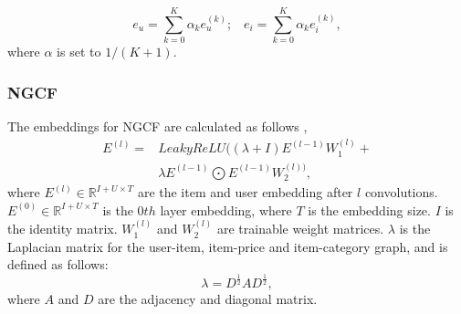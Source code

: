 \begin{equation}
    e_u = \sum_{k=0}^{K} \alpha_k e_u^{(k)};\;\;\; e_i = \sum_{k=0}^{K} \alpha_k e_i^{(k)},
\end{equation}
where $\alpha$ is set to $1/(K + 1)$.

\subsubsection{NGCF}\label{subsubsec:NGCF-embed}
The embeddings for NGCF are calculated as follows \cite{NGCF_2019},
\begin{equation}
    \begin{split}
        E^{(l)} = &LeakyReLU((\lambda + I)E^{(l-1)}W_1^{(l)}+\\
        & \lambda E^{(l-1)}\bigodot E^{(l-1)}W_2^{(l))},
    \end{split}
\end{equation}
where $E^{(l)} \in \mathbb{R}^{I+U \times T}$ are the item and user embedding after $l$ convolutions.
$E^{(0)} \in \mathbb{R}^{I+U \times T}$ is the $0th$ layer embedding, where $T$ is the embedding size.
$I$ is the identity matrix.
$W_1^{(l)}$ and $W_2^{(l)}$ are trainable weight matrices.
$\lambda$ is the Laplacian matrix for the user-item, item-price and item-category graph, and is defined as follows:
\begin{equation}
    \lambda = D^{\frac{1}{2}}AD^{\frac{1}{2}},
\end{equation}
where $A$ and $D$ are the adjacency and diagonal matrix.
